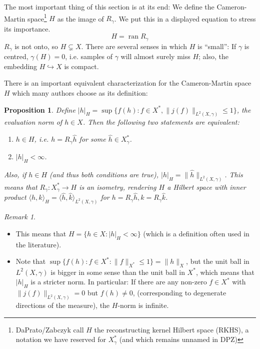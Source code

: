 \documentclass{scrartcl}
\newtheorem{prop}{Proposition}
\theoremstyle{definition}
\theoremstyle{remark}
\newtheorem{remark}{Remark}
\begin{document}
The most important thing of this section is at its end: We define the Cameron-Martin space\footnote{DaPrato/Zabczyk call $H$ the reconstructing kernel Hilbert space (RKHS), a notation we have reserved for $X_\gamma^*$ (and which remains unnamed in DPZ)} $H$ as the image of $R_\gamma$. We put this in a displayed equation to stress its importance.
\begin{displaymath}
H = \operatorname{ran} R_\gamma
\end{displaymath}
$R_\gamma$ is not onto, so $H\subsetneq X$. There are several senses in which $H$ is ``small'': If $\gamma$ is centred, $\gamma(H) = 0$, i.e. samples of $\gamma$ will almost surely miss $H$; also, the embedding $H\hookrightarrow X$ is compact.

There is an important equivalent characterization for the Cameron-Martin space $H$ which many authors choose as its definition:
\begin{prop}
Define $|h|_H = \sup\{f(h): f\in X^*, \|j(f)\|_{L^2(X, \gamma)} \leq 1\}$, the evaluation norm of $h\in X$. Then the following two statements are equivalent:
\begin{enumerate}
\item $h\in H$, i.e. $h = R_\gamma \hat h$ for some $\hat h\in X_\gamma^*$.
\item $|h|_H < \infty$.
\end{enumerate}
Also, if $h\in H$ (and thus both conditions are true), $|h|_H = \|\hat h\|_{L^2(X,\gamma)}$. This means that $R_\gamma: X_\gamma^* \to H$ is an isometry, rendering $H$ a Hilbert space  with inner product $\langle h, k\rangle_H = \langle \hat h, \hat k\rangle_{L^2(X,\gamma)}$ for $h = R_\gamma \hat h, k = R_\gamma \hat k$.
\end{prop}
\begin{remark}
\begin{itemize}
\item  This means that $H = \{h\in X: |h|_H < \infty\}$ (which is a definition often used in the literature).
\item Note that $\sup\{f(h): f\in X^*: \|f\|_{X^*}\leq 1\} = \|h\|_X$, but the unit ball in $L^2(X,\gamma)$ is bigger in some sense than the unit ball in $X^*$, which means that $|h|_H$ is a stricter norm. In particular: If there are any non-zero $f\in X^*$ with $\|j(f)\|_{L^2(X,\gamma)} = 0$ but $f(h) \neq 0$, (corresponding to degenerate directions of the measure), the $H$-norm is infinite.
\end{itemize}
\end{remark}
\end{document}
